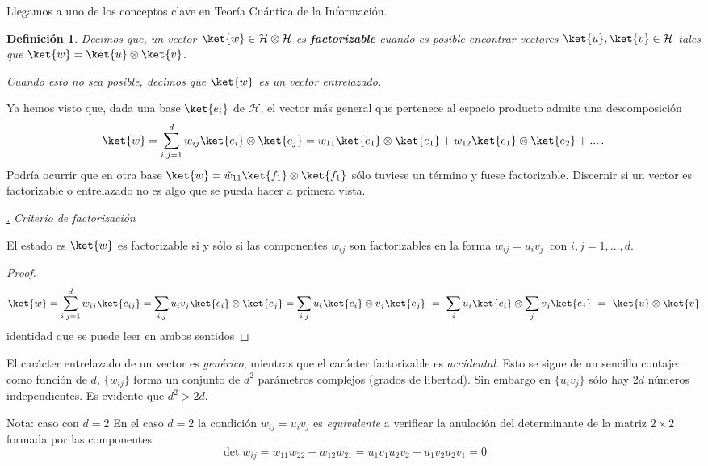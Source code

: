 \documentclass[a4paper,11pt]{book} %
\newtheorem{definicion_contador}{Definición}
\newcommand{\Definicion}[1]{
		\begin{mybox_gray2}{}
			\begin{definicion_contador}
				 #1 
			\end{definicion_contador} 
		\end{mybox_gray2}
	}
\numberwithin{equation}{chapter}
\def\subsubiContadorIt{\par\addtocounter{subsubsection}{1}\underline{\it\thesubsubsection.}\hskip0.5cm \setcounter{subsubsubsectionIt}{0}}
\newcommand{\SubsubiIt}[1]{
		\subsubiContadorIt \textit{#1}
	}
\newcounter{subsubsubsectionIt}[subsubsection]
\begin{document}
Llegamos a uno de los conceptos clave en Teoría Cuántica de la Información. 
	\Definicion{
	Decimos que, un vector $\ket{w}\in \mathcal{H}\otimes\mathcal{H}$ es \textbf{factorizable} cuando es posible encontrar vectores $\ket{u},\ket{v}\in \mathcal{H}$ tales que $ \ket{w} = \ket{u}\otimes\ket{v}$.
\vspace{0.3cm}

Cuando esto no sea posible, decimos que  $\ket{w}$ es un vector entrelazado.
	}

Ya hemos visto que, dada una base $\ket{e_i}$ de $\mathcal{H}$, el vector más general que pertenece al espacio producto admite una descomposición 
\begin{equation}
\ket{w} = \sum_{i,j=1}^d w_{ij}\ket{e_{i}}\otimes \ket{e_j} = w_{11}\ket{e_1}\otimes\ket{e_1} + w_{12}\ket{e_1}\otimes\ket{e_2} + ...\, .
\end{equation}
Podría ocurrir que en otra base $\ket{w} = \tilde w_{11} \ket{f_1}\otimes\ket{f_1}$ sólo tuviese un término y fuese factorizable. Discernir si un vector es factorizable o entrelazado no es algo que se pueda hacer a primera vista.


			\SubsubiIt{Criterio de factorización}

\begin{mybox_gray2}{}
El estado es $\ket{w}$ es factorizable si y sólo si las componentes $w_{ij}$ son factorizables en la forma $w_{ij} = u_i v_j~$ con $i,j=1,...,d$. 
\end{mybox_gray2}
\begin{proof}
\begin{equation}
\ket{w}= \sum_{i,j=1}^d w_{ij} \ket{e_{ij}}  = \sum_{i,j} u_{i}v_j \ket{e_i}\otimes \ket{e_j}= \sum_{i,j} u_{i} \ket{e_i}\otimes v_j\ket{e_j}  ~ =~ \sum_i u_i\ket{e_i} \otimes \sum_j v_j\ket{e_j} ~=~   \ket{u}\otimes \ket{v}
\end{equation}
identidad que se puede leer en ambos sentidos
\end{proof}

El carácter entrelazado de un vector es \textit{genérico}, mientras que el carácter factorizable es \textit{accidental}. Esto se sigue de un sencillo contaje: 
como función de $d$,  $\{w_{ij}\}$ forma un conjunto de $d^2$ parámetros complejos (grados de libertad). Sin embargo en $\{u_i v_j\}$ sólo hay $2d$ números independientes. Es evidente que $d^2>2d$.

	\begin{mybox_blue}{Nota: caso con ${d=2}$ }
	En el caso  $d=2$  la condición $w_{ij} = u_i v_j$ es \textit{equivalente} a verificar
    la anulación del  determinante de la matriz $2\times 2$ formada por las componentes
	\begin{equation}
	\det w_{ij} =  w_{11}w_{22}- w_{12}w_{21} = u_1v_1u_2v_2-u_1v_2u_2v_1=0
	\end{equation}  
	\end{mybox_blue}
\end{document}
